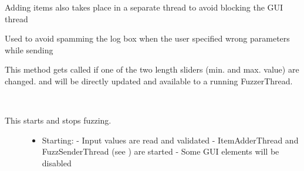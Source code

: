 \documentclass[letterpaper,10pt,english]{sphinxmanual}
\begin{document}
\begin{fulllineitems}

\begin{fulllineitems}
\label{\detokenize{src:src.FuzzerTab.FuzzerTab.itemAdderThread}}
Adding items also takes place in a separate thread to avoid blocking the GUI thread

\end{fulllineitems}


\begin{fulllineitems}
\label{\detokenize{src:src.FuzzerTab.FuzzerTab.packetBuildErrorCount}}
Used to avoid spamming the log box when the user specified wrong parameters while sending

\end{fulllineitems}


\begin{fulllineitems}
\label{\detokenize{src:src.FuzzerTab.FuzzerTab.prepareUI}}
\end{fulllineitems}


\begin{fulllineitems}
\label{\detokenize{src:src.FuzzerTab.FuzzerTab.sliderChanged}}
This method gets called if one of the two length sliders (min. and max. value) are changed.
 and  will be directly updated and available
to a running FuzzerThread.

\end{fulllineitems}


\begin{fulllineitems}
\label{\detokenize{src:src.FuzzerTab.FuzzerTab.toggleFuzzing}}~\begin{description}
\item[{This starts and stops fuzzing.}] \leavevmode\begin{itemize}
\item {} 
Starting:
- Input values are read and validated
- ItemAdderThread and FuzzSenderThread (see {\hyperref[\detokenize{src:src.SenderThread.FuzzSenderThread}]{}}) are started
- Some GUI elements will be disabled


\end{itemize}
\end{description}
\end{fulllineitems}
\end{fulllineitems}
\end{document}
